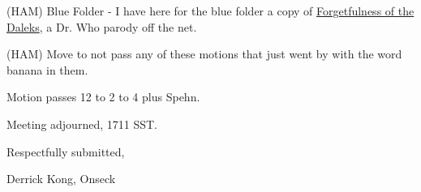 (HAM) Blue Folder - I have here for the blue folder a copy of
\underline{Forgetfulness of the Daleks}, a Dr. Who parody off the net.

(HAM) Move to not pass any of these motions that just went by with the
word banana in them.

Motion passes 12 to 2 to 4 plus Spehn.

Meeting adjourned, 1711 SST.

\vspace{0.15in}
\begin{center}
Respectfully submitted,

Derrick Kong, Onseck
\end{center}

